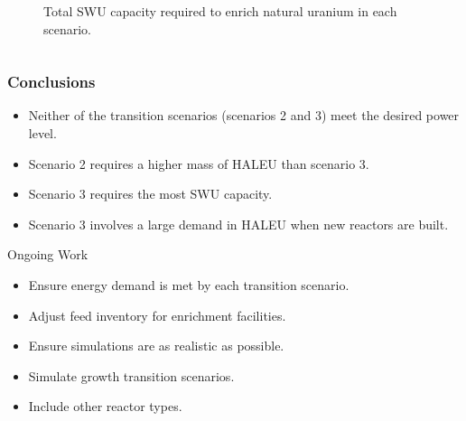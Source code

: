 \begin{frame}
\begin{columns}
\begin{figure}[h]
            \vspace*{-0.5cm}
      \caption{Total \gls{SWU} capacity required to enrich natural uranium in each scenario.}
      \label{fig:swu}
  \end{figure}
  \end{columns}
\end{frame}


\begin{frame}
\frametitle{Conclusions}
    \begin{itemize}
        \item Neither of the transition scenarios (scenarios 2 and 3) meet the desired power level.
        \item Scenario 2 requires a higher mass of \gls{HALEU} than scenario 3.
        \item Scenario 3 requires the most \gls{SWU} capacity.
        \item Scenario 3 involves a large demand in \gls{HALEU} when 
              new reactors are built.
    \end{itemize}

    \begin{block}{Ongoing Work}
        \begin{itemize}
            \item Ensure energy demand is met by each transition scenario.
            \item Adjust feed inventory for enrichment facilities.
            \item Ensure simulations are as realistic as possible.
            \item Simulate growth transition scenarios.
            \item Include other reactor types.
        \end{itemize}
    \end{block}
    

\end{frame}

